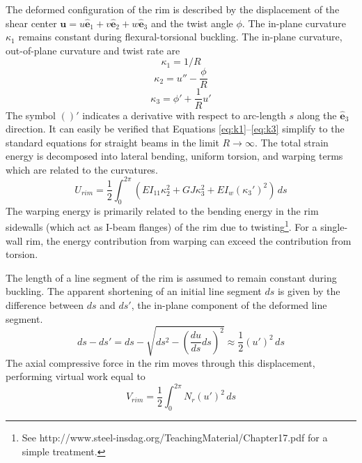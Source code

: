 \documentclass{bmd2016p}
\newcommand{\e}{\ensuremath{\hat{\bm{e}}_1}}
\newcommand{\ee}{\ensuremath{\hat{\bm{e}}_2}}
\newcommand{\eee}{\ensuremath{\hat{\bm{e}}_3}}
\begin{document}
The deformed configuration of the rim is described by the displacement of the shear center $\bm{u}=u\e + v\ee + w\eee$ and the twist angle $\phi$. The in-plane curvature $\kappa_1$ remains constant during flexural-torsional buckling. The in-plane curvature, out-of-plane curvature and twist rate are
	\begin{equation}\label{eq:k1}
	\kappa_1 = 1/R
	\end{equation}
	\begin{equation}\label{eq:k2}
	\kappa_2 = u'' - \frac{\phi}{R}
	\end{equation}
	\begin{equation}\label{eq:k3}
	\kappa_3 = \phi' + \frac{1}{R} u'
	\end{equation}
The symbol $()'$ indicates a derivative with respect to arc-length $s$ along the \eee{} direction. It can easily be verified that Equations \ref{eq:k1}--\ref{eq:k3} simplify to the standard equations for straight beams in the limit $R\rightarrow \infty$. The total strain energy is decomposed into lateral bending, uniform torsion, and warping terms which are related to the curvatures.
	\begin{equation}\label{eq:Urim}
	U_{rim} = \frac{1}{2} \int_0^{2\pi} \left( EI_{11} \kappa_2^2 + GJ \kappa_3^2 + EI_w (\kappa_3')^2 \right)\, ds
	\end{equation}
The warping energy is primarily related to the bending energy in the rim sidewalls (which act as I-beam flanges) of the rim due to twisting\footnote{See http://www.steel-insdag.org/TeachingMaterial/Chapter17.pdf for a simple treatment.}. For a single-wall rim, the energy contribution from warping can exceed the contribution from torsion.

The length of a line segment of the rim is assumed to remain constant during buckling. The apparent shortening of an initial line segment $ds$ is given by the difference between $ds$ and $ds'$, the in-plane component of the deformed line segment.
	\begin{equation}\label{eq:ds}
	ds - ds' = ds - \sqrt{ds^2 - \left(\frac{du}{ds}ds\right)^2} \approx \frac{1}{2} (u')^2 \, ds
	\end{equation}
The axial compressive force in the rim moves through this displacement, performing virtual work equal to
	\begin{equation}\label{eq:Vrim}
	V_{rim} = \frac{1}{2} \int_0^{2\pi} N_r (u')^2 \, ds
	\end{equation}
\end{document}
